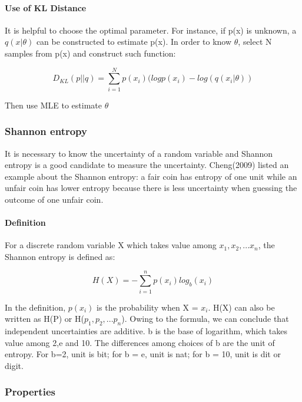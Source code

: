 \documentclass[
]{article}
\begin{document}
\hypertarget{use-of-kl-distance}{%
\paragraph{Use of KL Distance}\label{use-of-kl-distance}}

It is helpful to choose the optimal parameter. For instance, if p(x) is
unknown, a \(q(x|\theta)\) can be constructed to estimate p(x). In order
to know \(\theta\), select N samples from p(x) and construct such
function:

\[D_{KL}(p||q)=\sum_{i=1}^Np(x_i)(logp(x_i)-log(q(x_i|\theta))\]

Then use MLE to estimate \(\theta\)

\hypertarget{shannon-entropy}{%
\subsubsection{Shannon entropy}\label{shannon-entropy}}

It is necessary to know the uncertainty of a random variable and Shannon
entropy is a good candidate to measure the uncertainty. Cheng(2009)
listed an example about the Shannon entropy: a fair coin has entropy of
one unit while an unfair coin has lower entropy because there is less
uncertainty when guessing the outcome of one unfair coin.

\hypertarget{definition-3}{%
\paragraph{Definition}\label{definition-3}}

For a discrete random variable X which takes value among
\(x_1,x_2,...x_n\), the Shannon entropy is defined as:

\[H(X)=-\sum_{i=1}^np(x_i)log_b(x_i)\]

In the definition, \(p(x_i)\) is the probability when X = \(x_i\). H(X)
can also be written as H(P) or H(\(p_1,p_2,...p_n\)). Owing to the
formula, we can conclude that independent uncertainties are additive. b
is the base of logarithm, which takes value among 2,e and 10. The
differences among choices of b are the unit of entropy. For b=2, unit is
bit; for b = e, unit is nat; for b = 10, unit is dit or digit.

\hypertarget{properties}{%
\subsubsection{Properties}\label{properties}}
\end{document}
